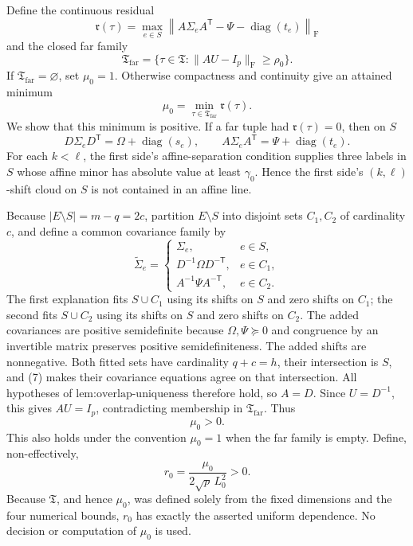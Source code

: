 Define the continuous residual
\[
\mathfrak r(\tau)=
\max_{e\in S}
\left\|A\Sigma_eA^{\mathsf T}
-\Psi-\operatorname{diag}(t_e)\right\|_{\mathrm F}
\]
and the closed far family
\[
\mathfrak T_{\mathrm{far}}
=\{\tau\in\mathfrak T:\|AU-I_p\|_{\mathrm F}\geq\rho_0\}.
\]
If \(\mathfrak T_{\mathrm{far}}=\varnothing\), set \(\mu_0=1\). Otherwise compactness and continuity give an attained minimum
\[
\mu_0=\min_{\tau\in\mathfrak T_{\mathrm{far}}}\mathfrak r(\tau).
\tag{6}
\]
We show that this minimum is positive. If a far tuple had \(\mathfrak r(\tau)=0\), then on \(S\)
\[
D\Sigma_eD^{\mathsf T}=\Omega+\operatorname{diag}(s_e),
\qquad
A\Sigma_eA^{\mathsf T}=\Psi+\operatorname{diag}(t_e).
\tag{7}
\]
For each \(k<\ell\), the first side's affine-separation condition supplies three labels in \(S\) whose affine minor has absolute value at least \(\gamma_0\). Hence the first side's \((k,\ell)\)-shift cloud on \(S\) is not contained in an affine line.

Because \(|E\setminus S|=m-q=2c\), partition \(E\setminus S\) into disjoint sets \(C_1,C_2\) of cardinality \(c\), and define a common covariance family by
\[
\widetilde\Sigma_e=
\begin{cases}
\Sigma_e,&e\in S,\\
D^{-1}\Omega D^{-\mathsf T},&e\in C_1,\\
A^{-1}\Psi A^{-\mathsf T},&e\in C_2.
\end{cases}
\]
The first explanation fits \(S\cup C_1\) using its shifts on \(S\) and zero shifts on \(C_1\); the second fits \(S\cup C_2\) using its shifts on \(S\) and zero shifts on \(C_2\). The added covariances are positive semidefinite because \(\Omega,\Psi\succeq0\) and congruence by an invertible matrix preserves positive semidefiniteness. The added shifts are nonnegative. Both fitted sets have cardinality \(q+c=h\), their intersection is \(S\), and (7) makes their covariance equations agree on that intersection. All hypotheses of \(\text{lem:overlap-uniqueness}\) therefore hold, so \(A=D\). Since \(U=D^{-1}\), this gives \(AU=I_p\), contradicting membership in \(\mathfrak T_{\mathrm{far}}\). Thus
\[
\mu_0>0.
\tag{8}
\]
This also holds under the convention \(\mu_0=1\) when the far family is empty. Define, non-effectively,
\[
r_0=\frac{\mu_0}{2\sqrt p\,L_0^2}>0.
\tag{9}
\]
Because \(\mathfrak T\), and hence \(\mu_0\), was defined solely from the fixed dimensions and the four numerical bounds, \(r_0\) has exactly the asserted uniform dependence. No decision or computation of \(\mu_0\) is used.


